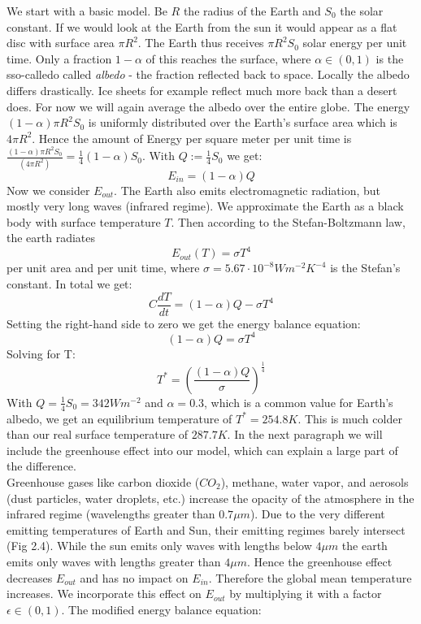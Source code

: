 \documentclass[%
thesis=student,%
coverpage=false,%
titlepage=false,%
headmarks=true, %
english,%
font=libertine, %
math=newpxtx, %
BCOR=5mm,%
coverBCOR=11mm%
]{tumbook}
\begin{document}
We start with a basic model.
Be $R$ the radius of the Earth and $S_{0}$ the solar constant. If we would look at the Earth from the sun it would appear as a flat disc with surface area $\pi R^2$. The Earth thus receives $\pi R^2 S_{0}$ solar energy per unit time. Only a fraction $1-\alpha$ of this reaches the surface, where $\alpha \in (0,1)$ is the sso-calledo called \textit{albedo} - the fraction reflected back to space. Locally the albedo differs drastically. Ice sheets for example reflect much more back than a desert does. For now we will again average the albedo over the entire globe. The energy $(1-\alpha)\pi R^2S_{0}$ is uniformly distributed over the Earth's surface area which is $4\pi R^2$. Hence the amount of Energy per square meter per unit time is $\frac{(1-\alpha)\pi R^2S_{0}}{(4\pi R^2)} = \frac{1}{4}(1-\alpha)S_{0}$. With $Q:=\frac{1}{4}S_{0}$ we get: 
\begin{equation}
    E_{in} = (1-\alpha)Q
\end{equation}
Now we consider $E_{out}$. The Earth also emits electromagnetic radiation, but mostly very long waves (infrared regime). We approximate the Earth as a black body with surface temperature $T$. Then according to the Stefan-Boltzmann law, the earth radiates 
\begin{equation}
    E_{out}(T) = \sigma T^4
\end{equation}
per unit area and per unit time, where $\sigma = 5.67 \cdot 10^{-8}Wm^{-2}K^{-4}$ is the Stefan's constant. In total we get: 
\begin{equation}
    C\frac{dT}{dt} = (1-\alpha)Q - \sigma T^4
    \label{temperature independent albedo EBM}
\end{equation}
Setting the right-hand side to zero we get the energy balance equation: 
\begin{equation}
    (1-\alpha)Q = \sigma T^4
\end{equation}
Solving for T: 
\begin{equation}
    T^* = (\frac{(1-\alpha)Q}{\sigma})^\frac{1}{4}
\end{equation}
With $Q = \frac{1}{4}S_{0}= 342 Wm^{-2}$ and $\alpha = 0.3$, which is a common value for Earth's albedo, we get an equilibrium temperature of $T^* = 254.8K$. This is much colder than our real surface temperature of $287.7K$. In the next paragraph we will include the greenhouse effect into our model, which can explain a large part of the difference.
\\ 
Greenhouse gases like carbon dioxide ($CO_{2}$), methane, water vapor, and aerosols (dust particles, water droplets, etc.) increase the opacity of the atmosphere in the infrared regime (wavelengths greater than $0.7 \mu m$). Due to the very different emitting temperatures of Earth and Sun, their emitting regimes barely intersect (Fig 2.4). While the sun emits only waves with lengths below $4 \mu m$ the earth emits only waves with lengths greater than $4 \mu m$. Hence the greenhouse effect decreases $E_{out}$ and has no impact on $E_{in}$. Therefore the global mean temperature increases. We incorporate this effect on $E_{out}$ by multiplying it with a factor $\epsilon \in (0,1)$. The modified energy balance equation: 
\end{document}

